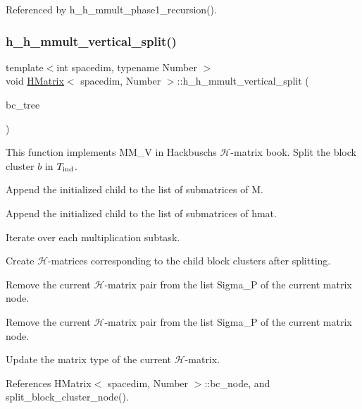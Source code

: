 Referenced by h\+\_\+h\+\_\+mmult\+\_\+phase1\+\_\+recursion().

\mbox{\label{classHMatrix_a253c23d09e89a9a37a7d808374b5ae4e}} 
\subsubsection{\texorpdfstring{h\+\_\+h\+\_\+mmult\+\_\+vertical\+\_\+split()}{h\_h\_mmult\_vertical\_split()}}
{\footnotesize\ttfamily template$<$int spacedim, typename Number $>$ \\
void \hyperlink{classHMatrix}{H\+Matrix}$<$ spacedim, Number $>$\+::h\+\_\+h\+\_\+mmult\+\_\+vertical\+\_\+split (\begin{DoxyParamCaption}\item[{\hyperlink{classBlockClusterTree}{Block\+Cluster\+Tree}$<$ spacedim, Number $>$ \&}]{bc\+\_\+tree }\end{DoxyParamCaption})}

This function implements {\ttfamily M\+M\+\_\+V} in Hackbusch\textquotesingle{}s $\mathcal{H}$-\/matrix book. Split the block cluster $b$ in $T_{\rm ind}$.

Append the initialized child to the list of submatrices of {\ttfamily M}.

Append the initialized child to the list of submatrices of {\ttfamily hmat}.

Iterate over each multiplication subtask.

Create $\mathcal{H}$-\/matrices corresponding to the child block clusters after splitting.

Remove the current $\mathcal{H}$-\/matrix pair from the list {\ttfamily Sigma\+\_\+P} of the current matrix node.

Remove the current $\mathcal{H}$-\/matrix pair from the list {\ttfamily Sigma\+\_\+P} of the current matrix node.

Update the matrix type of the current $\mathcal{H}$-\/matrix.

References H\+Matrix$<$ spacedim, Number $>$\+::bc\+\_\+node, and split\+\_\+block\+\_\+cluster\+\_\+node().

\mbox{\label{classHMatrix_ab100d1469f662efdbf894a0345b702b8}} 
